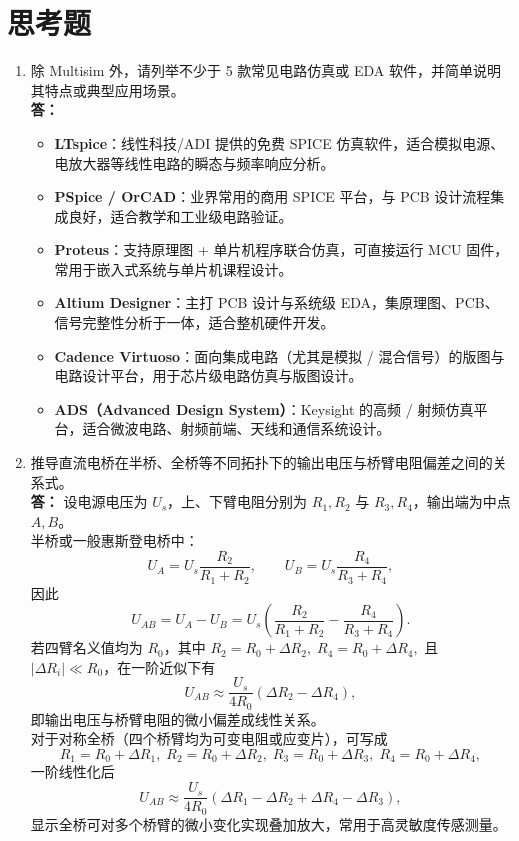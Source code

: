 \documentclass[a4paper,8pt,twocolumn]{article}
\begin{document}
\section{思考题}
\begin{enumerate}
  \item 除 Multisim 外，请列举不少于 5 款常见电路仿真或 EDA 软件，并简单说明其特点或典型应用场景。\\[0.5em]
  \textbf{答：}
  \begin{itemize}
    \item \textbf{LTspice}：线性科技/ADI 提供的免费 SPICE 仿真软件，适合模拟电源、电放大器等线性电路的瞬态与频率响应分析。
    \item \textbf{PSpice / OrCAD}：业界常用的商用 SPICE 平台，与 PCB 设计流程集成良好，适合教学和工业级电路验证。
    \item \textbf{Proteus}：支持原理图 + 单片机程序联合仿真，可直接运行 MCU 固件，常用于嵌入式系统与单片机课程设计。
    \item \textbf{Altium Designer}：主打 PCB 设计与系统级 EDA，集原理图、PCB、信号完整性分析于一体，适合整机硬件开发。
    \item \textbf{Cadence Virtuoso}：面向集成电路（尤其是模拟 / 混合信号）的版图与电路设计平台，用于芯片级电路仿真与版图设计。
    \item \textbf{ADS（Advanced Design System）}：Keysight 的高频 / 射频仿真平台，适合微波电路、射频前端、天线和通信系统设计。
  \end{itemize}

  \item 推导直流电桥在半桥、全桥等不同拓扑下的输出电压与桥臂电阻偏差之间的关系式。\\[0.5em]
  \textbf{答：}
  设电源电压为 $U_s$，上、下臂电阻分别为 $R_1,R_2$ 与 $R_3,R_4$，输出端为中点 $A,B$。\\
  半桥或一般惠斯登电桥中：
  \[
    U_A = U_s\frac{R_2}{R_1+R_2},\qquad
    U_B = U_s\frac{R_4}{R_3+R_4},
  \]
  因此
  \[
    U_{AB} = U_A - U_B
            = U_s\!\left(
              \frac{R_2}{R_1+R_2}
              -\frac{R_4}{R_3+R_4}
            \right).
  \]
  若四臂名义值均为 $R_0$，其中
  \(
    R_2 = R_0 + \Delta R_2,\;
    R_4 = R_0 + \Delta R_4,
  \)
  且 $|\Delta R_i|\ll R_0$，在一阶近似下有
  \[
    U_{AB} \approx \frac{U_s}{4R_0}\left(\Delta R_2 - \Delta R_4\right),
  \]
  即输出电压与桥臂电阻的微小偏差成线性关系。\\
  对于对称全桥（四个桥臂均为可变电阻或应变片），可写成
  \[
    R_1 = R_0 + \Delta R_1,\;
    R_2 = R_0 + \Delta R_2,\;
    R_3 = R_0 + \Delta R_3,\;
    R_4 = R_0 + \Delta R_4,
  \]
  一阶线性化后
  \[
    U_{AB} \approx
    \frac{U_s}{4R_0}\left(
      \Delta R_1 - \Delta R_2 + \Delta R_4 - \Delta R_3
    \right),
  \]
  显示全桥可对多个桥臂的微小变化实现叠加放大，常用于高灵敏度传感测量。


\end{enumerate}
\end{document}

